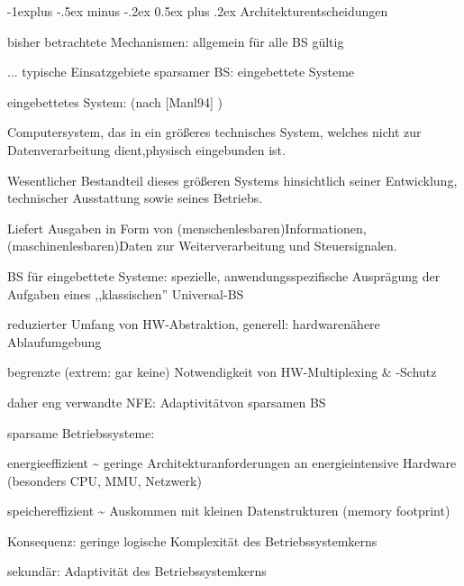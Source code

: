\documentclass[a4paper]{article}
\makeatletter
\renewcommand{\subsection}{\@startsection{subsection}{2}{0mm}%
 {-1explus -.5ex minus -.2ex}%
 {0.5ex plus .2ex}%
 {\normalfont\normalsize\bfseries}}
\makeatother
\begin{document}
\begin{multicols}{3}
    \subsection{Architekturentscheidungen}

    \begin{itemize*}
        \item
        bisher betrachtete Mechanismen: allgemein für alle BS gültig
        \item
        ... typische Einsatzgebiete sparsamer BS: eingebettete Systeme
        \item
        eingebettetes System: (nach [Manl94] )
        \begin{itemize*}
            \item Computersystem, das in ein größeres technisches System, welches nicht zur Datenverarbeitung dient,physisch eingebunden ist.
            \item Wesentlicher Bestandteil dieses größeren Systems hinsichtlich seiner Entwicklung, technischer Ausstattung sowie seines Betriebs.
            \item Liefert Ausgaben in Form von (menschenlesbaren)Informationen, (maschinenlesbaren)Daten zur Weiterverarbeitung und Steuersignalen.
        \end{itemize*}
        \item
        BS für eingebettete Systeme: spezielle, anwendungsspezifische
        Ausprägung der Aufgaben eines ,,klassischen'' Universal-BS
        \begin{itemize*}
            \item reduzierter Umfang von HW-Abstraktion, generell: hardwarenähere Ablaufumgebung
            \item begrenzte (extrem: gar keine) Notwendigkeit von HW-Multiplexing \& -Schutz
        \end{itemize*}
        \item
        daher eng verwandte NFE: Adaptivitätvon sparsamen BS
        \item
        sparsame Betriebssysteme:
        \begin{itemize*}
            \item energieeffizient \textasciitilde{} geringe Architekturanforderungen an energieintensive Hardware (besonders CPU, MMU, Netzwerk)
            \item speichereffizient \textasciitilde{} Auskommen mit kleinen Datenstrukturen (memory footprint)
        \end{itemize*}
        \item
        Konsequenz: geringe logische Komplexität des Betriebssystemkerns
        \item
        sekundär: Adaptivität des Betriebssystemkerns
    \end{itemize*}



\end{multicols}
\end{document}
